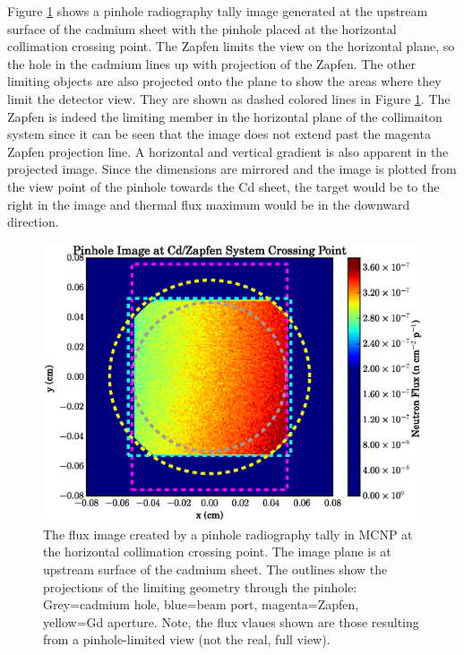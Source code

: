 \documentclass[preprint,12pt]{elsarticle}
\begin{document}
Figure \ref{fig:pinhole_image} shows a pinhole radiography tally image generated at the upstream surface of the cadmium sheet with the pinhole placed at the horizontal collimation crossing point.  The Zapfen limits the view on the horizontal plane, so the hole in the cadmium lines up with projection of the Zapfen.  The other limiting objects are also projected onto the plane to show the areas where they limit the detector view.  They are shown as dashed colored lines in Figure \ref{fig:pinhole_image}.  The Zapfen is indeed the limiting member in the horizontal plane of the collimaiton system since it can be seen that the image does not extend past the magenta Zapfen projection line.  A horizontal and vertical gradient is also apparent in the projected image.  Since the dimensions are mirrored and the image is plotted from the view point of the pinhole towards the Cd sheet, the target would be to the right in the image and thermal flux maximum would be in the downward direction. 


\begin{figure}[h!] 
  \centering
    \includegraphics[width=\columnwidth]{graphics/pinhole.eps}
     \caption{The flux image created by a pinhole radiography tally in MCNP at the horizontal collimation crossing point.  The image plane is at upstream surface of the cadmium sheet.  The outlines show the projections of the limiting geometry through the pinhole: Grey=cadmium hole, blue=beam port, magenta=Zapfen, yellow=Gd aperture.  Note, the flux vlaues shown are those resulting from a pinhole-limited view (not the real, full view).  \label{fig:pinhole_image}}
\end{figure}
\end{document}
